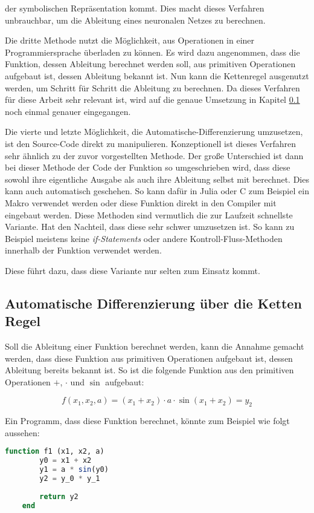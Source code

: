 der symbolischen Repräsentation kommt.
Dies macht dieses Verfahren unbrauchbar, um die Ableitung eines neuronalen Netzes zu berechnen.

Die dritte Methode nutzt die Möglichkeit, aus Operationen 
in einer Programmiersprache überladen zu können.
Es wird dazu angenommen, dass die Funktion, dessen Ableitung berechnet werden soll, aus primitiven Operationen aufgebaut ist, dessen Ableitung bekannt ist.
Nun kann die Kettenregel ausgenutzt werden, um Schritt für Schritt die Ableitung zu berechnen.
Da dieses Verfahren für diese Arbeit sehr relevant ist, wird auf die genaue Umsetzung in Kapitel \ref{sec:ketten_regel} noch einmal genauer eingegangen.

Die vierte und letzte Möglichkeit, die Automatische-Differenzierung umzusetzen, ist den Source-Code direkt zu manipulieren.
Konzeptionell ist dieses Verfahren sehr ähnlich zu der zuvor vorgestellten Methode. 
Der große Unterschied ist dann bei dieser Methode der Code der Funktion so umgeschrieben wird, 
dass diese sowohl ihre eigentliche Ausgabe als auch ihre Ableitung selbst mit berechnet.
Dies kann auch automatisch geschehen.
So kann dafür in Julia oder C zum Beispiel ein Makro verwendet werden oder diese Funktion direkt in den Compiler mit eingebaut werden.
Diese Methoden sind vermutlich die zur Laufzeit schnellste Variante.
Hat den Nachteil, dass diese sehr schwer umzusetzen ist.
So kann zu Beispiel meistens keine \textit{if-Statements} oder andere Kontroll-Fluss-Methoden innerhalb der Funktion verwendet werden. 

Diese führt dazu, dass diese Variante nur selten zum Einsatz kommt.

\subsection{Automatische Differenzierung über die Ketten Regel} \label{sec:ketten_regel}

Soll die Ableitung einer Funktion berechnet werden, 
kann die Annahme gemacht werden, 
dass diese Funktion aus primitiven Operationen aufgebaut ist, dessen Ableitung bereits bekannt ist.
So ist die folgende Funktion aus den primitiven Operationen $+$, $\cdot$ und $\sin$ aufgebaut:

$$
f(x_1, x_2, a) = (x_1 + x_2) \cdot a \cdot \sin(x_1 + x_2) = y_2
$$

Ein Programm, dass diese Funktion berechnet, könnte zum Beispiel wie folgt aussehen:

\begin{lstlisting}[language=Julia]
    function f1 (x1, x2, a)
        y0 = x1 + x2
        y1 = a * sin(y0)
        y2 = y_0 * y_1
        
    	return y2
    end
\end{lstlisting}

